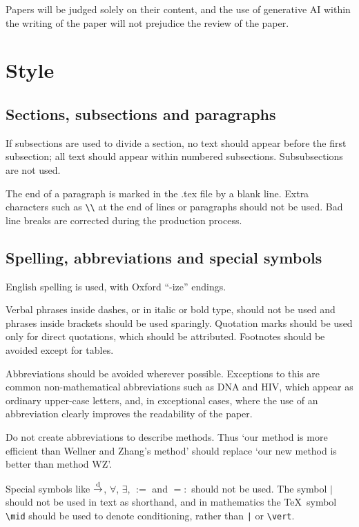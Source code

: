 \documentclass[lineno]{biometrika}
\begin{document}
Papers will be judged solely on their content, and the use of generative AI within the writing of the paper will not prejudice the review of the paper.



\section{Style}

\subsection{Sections, subsections and paragraphs}

If subsections are used to divide a section, no text should appear before the first subsection; all text should appear within numbered subsections.  Subsubsections are not used.

The end of a paragraph is marked in the .tex file by a blank line.  Extra characters such as \verb+\\+ at the end of lines or paragraphs should not be used.  Bad line breaks are corrected during the production process.

\subsection{Spelling, abbreviations and special symbols}

English spelling is used, with Oxford ``-ize'' endings.

Verbal phrases inside dashes, or in italic or bold type, should not be used  and phrases inside brackets should be used sparingly. Quotation marks should be used only for direct quotations, which should be attributed. Footnotes should be avoided except for tables.

Abbreviations should be avoided wherever possible.  Exceptions to this are common non-mathematical abbreviations such as DNA and HIV, which appear as ordinary upper-case letters, and, in exceptional cases, where the use of an abbreviation clearly improves the readability of the paper.

Do not create abbreviations to describe methods. Thus `our method is more efficient than Wellner and Zhang's method' should replace `our new method is better than method WZ'.

Special symbols like $\mathop{\rightarrow}\limits^{\rm d}$, $\forall$, $\exists$, $:=$ and $=:$  should not be used.  The symbol $\mid$ should not be used in text as shorthand, and in mathematics the \TeX\ symbol \verb+\mid+ should be used to denote conditioning, rather than \verb+|+ or \verb"\vert".
\end{document}
